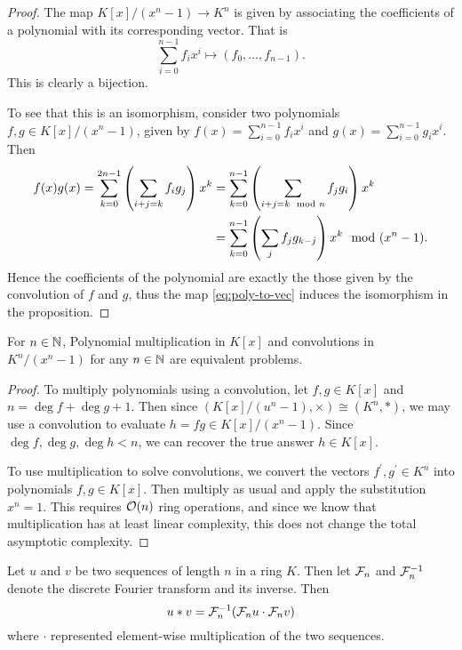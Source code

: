 \begin{proof}
    The map $K[x]/(x^n - 1) \to K^n$ is given by associating the coefficients of a polynomial with its corresponding vector. That is
    \begin{equation}\label{eq:poly-to-vec}
        \sum_{i=0}^{n-1} f_i x^i \mapsto (f_0, \ldots, f_{n-1}).
    \end{equation}
    This is clearly a bijection.

    To see that this is an isomorphism, consider two polynomials $f, g \in K[x]/(x^n - 1)$, given by $f(x) = \sum_{i=0}^{n-1} f_i x^i$ and $g(x) = \sum_{i=0}^{n-1} g_i x^i$. Then
    \begin{align*}
        f(x)g(x) = \sum^{2n-1}_{k=0} \left(\sum_{i + j = k}f_ig_j\right) x^k
        &= \sum^{n-1}_{k=0} \left(\sum_{i + j = k \mod n}f_jg_i\right) x^k\\
        &= \sum^{n-1}_{k=0} \left(\sum_j f_jg_{k-j}\right) x^k \mod (x^n - 1).
    \end{align*}
    Hence the coefficients of the polynomial are exactly the those given by the convolution of $f$ and $g$, thus the map \ref{eq:poly-to-vec} induces the isomorphism in the proposition.
\end{proof}

\begin{corollary}\label{cor:equiv-poly-conv}
    For $n \in {\mathbb N}$, Polynomial multiplication in $K[x]$ and convolutions in $K^n/(x^n - 1)$ for any $n \in {\mathbb N}$ are equivalent problems.
\end{corollary}

\begin{proof}
    To multiply polynomials using a convolution, let $f, g \in K[x]$ and $n = \deg f + \deg g + 1$. Then since $(K[x]/(u^n - 1), \times) \cong (K^n, \ast)$, we may use a convolution to evaluate $h = fg \in K[x]/(x^n -1)$. Since $\deg f, \deg g, \deg h < n$, we can recover the true answer $h \in K[x]$.

    To use multiplication to solve convolutions, we convert the vectors $f^\prime, g^\prime \in K^n$ into polynomials $f, g \in K[x]$. Then multiply as usual and apply the substitution $x^n = 1$. This requires $\mathcal O(n)$ ring operations, and since we know that multiplication has at least linear complexity, this does not change the total asymptotic complexity.
\end{proof}

\begin{definition}\label{def:convolution-property}
    Let $u$ and $v$ be two sequences of length $n$ in a ring $K$. Then let $\mathcal F_n$ and $\mathcal F_n^{-1}$ denote the discrete Fourier transform and its inverse. Then
    \[
        u \ast v = \mathcal F_n^{-1}(\mathcal F_n u \cdot \mathcal F_n v)
    \]
    where $\cdot$ represented element-wise multiplication of the two sequences.
\end{definition}

